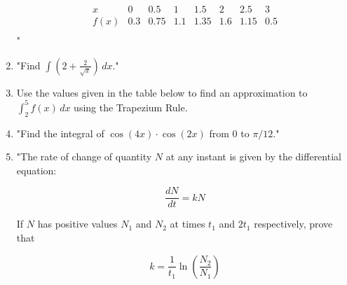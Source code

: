 \documentclass{article}
\begin{document}
\begin{enumerate}
\[
\begin{array}{c|ccccccc}
x & 0 & 0.5 & 1 & 1.5 & 2 & 2.5 & 3 \\
\hline
f(x) & 0.3 & 0.75 & 1.1 & 1.35 & 1.6 & 1.15 & 0.5 \\
\end{array}
\]"
\vspace{3cm}
\item "Find \(\int \left( 2 + \frac{2}{\sqrt{x}} \right) \, dx\)."
\vspace{3cm}
\item Use the values given in the table below to find an approximation to \(\int_{2}^{5} f(x) \, dx\) using the Trapezium Rule.
\vspace{3cm}
\item "Find the integral of \(\cos(4x) \cdot \cos(2x)\) from 0 to \(\pi/12\)."
\vspace{3cm}
\item "The rate of change of quantity \( N \) at any instant is given by the differential equation:

\[
\frac{dN}{dt} = kN
\]

If \( N \) has positive values \( N_1 \) and \( N_2 \) at times \( t_1 \) and \( 2t_1 \) respectively, prove that

\[
k = \frac{1}{t_1} \ln \left( \frac{N_2}{N_1} \right)
\]


\end{enumerate}
\end{document}
